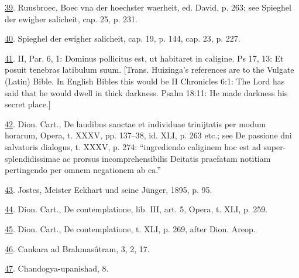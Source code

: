 \protect\hypertarget{23_NOTES.xhtmlux5cux23id_660}{\protect\hyperlink{17_Chapter_Ten__THE_FAILURE_OF_IMAG.xhtmlux5cux23id_659}{39}}.
Ruusbroec, Boec vna der hoechster waerheit, ed. David, p. 263; see
Spieghel der ewigher salicheit, cap. 25, p. 231.

\protect\hypertarget{23_NOTES.xhtmlux5cux23id_658}{\protect\hyperlink{17_Chapter_Ten__THE_FAILURE_OF_IMAG.xhtmlux5cux23id_657}{40}}.
Spieghel der ewigher salicheit, cap. 19, p. 144, cap. 23, p. 227.

\protect\hypertarget{23_NOTES.xhtmlux5cux23id_656}{\protect\hyperlink{17_Chapter_Ten__THE_FAILURE_OF_IMAG.xhtmlux5cux23id_655}{41}}.
II, Par. 6, 1: Dominus pollicitus est, ut habitaret in caligine. Ps 17,
13: Et posuit tenebras latibulum suum. {[}Trans. Huizinga's references
are to the Vulgate (Latin) Bible. In English Bibles this would be II
Chronicles 6:1: The Lord has said that he would dwell in thick darkness.
Psalm 18:11: He made darkness his secret place.{]}

\protect\hypertarget{23_NOTES.xhtmlux5cux23id_654}{\protect\hyperlink{17_Chapter_Ten__THE_FAILURE_OF_IMAG.xhtmlux5cux23id_653}{42}}.
Dion. Cart., De laudibus sanctae et individuae trinijtatis per modum
horarum, Opera, t. XXXV, pp. 137--38, id. XLI, p. 263 etc.; see De
passione dni salvatoris dialogus, t. XXXV, p. 274: ``ingrediendo
caliginem hoc est ad super-splendidissimae ac prorsus incomprehensibilis
Deitatis praefatam notitiam pertingendo per omnem negationem ab ea.''

\protect\hypertarget{23_NOTES.xhtmlux5cux23id_652}{\protect\hyperlink{17_Chapter_Ten__THE_FAILURE_OF_IMAG.xhtmlux5cux23id_651}{43}}.
Jostes, Meister Eckhart und seine Jünger, 1895, p. 95.

\protect\hypertarget{23_NOTES.xhtmlux5cux23id_650}{\protect\hyperlink{17_Chapter_Ten__THE_FAILURE_OF_IMAG.xhtmlux5cux23id_649}{44}}.
Dion. Cart., De contemplatione, lib. III, art. 5, Opera, t. XLI, p. 259.

\protect\hypertarget{23_NOTES.xhtmlux5cux23id_648}{\protect\hyperlink{17_Chapter_Ten__THE_FAILURE_OF_IMAG.xhtmlux5cux23id_647}{45}}.
Dion. Cart., De contemplatione, t. XLI, p. 269, after Dion. Areop.

\protect\hypertarget{23_NOTES.xhtmlux5cux23id_646}{\protect\hyperlink{17_Chapter_Ten__THE_FAILURE_OF_IMAG.xhtmlux5cux23id_645}{46}}.
Cankara ad Brahmasûtram, 3, 2, 17.

\protect\hypertarget{23_NOTES.xhtmlux5cux23id_644}{\protect\hyperlink{17_Chapter_Ten__THE_FAILURE_OF_IMAG.xhtmlux5cux23id_643}{47}}.
Chandogya-upanishad, 8.


